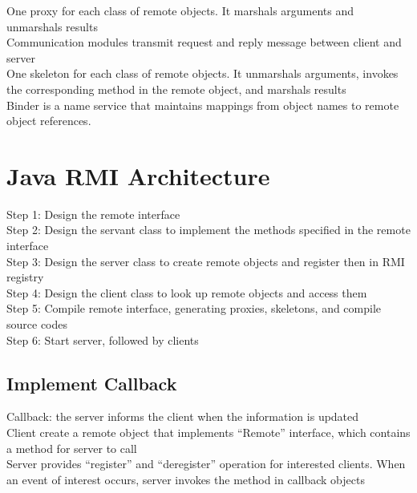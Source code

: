 \begin{multicols*}{2}
\noindent One proxy for each class of remote objects. It marshals arguments and unmarshals results\\

\noindent Communication modules transmit request and reply message between client and server\\

\noindent One skeleton for each class of remote objects. It unmarshals arguments, invokes the corresponding method in the remote object, and marshals results\\

\noindent Binder is a name service that maintains mappings from object names to remote object references.

\section{Java RMI Architecture}

\noindent Step 1: Design the remote interface\\

\noindent Step 2: Design the servant class to implement the methods specified in the remote interface\\

\noindent Step 3: Design the server class to create remote objects and register then in RMI registry\\

\noindent Step 4: Design the client  class to look up remote objects and access them\\

\noindent Step 5: Compile remote interface, generating proxies, skeletons, and compile source codes\\

\noindent Step 6: Start server, followed by clients

\subsection{Implement Callback}

\noindent Callback: the server informs the client when the information is updated\\

\noindent Client create a remote object that implements “Remote” interface, which contains a method for server to call\\

\noindent Server provides “register” and “deregister” operation for interested clients. When an event of interest occurs, server invokes the method in callback objects

\end{multicols*}
